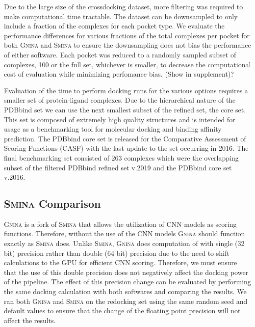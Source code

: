 \documentclass[journal=jcisd8,manuscript=article]{achemso}
\begin{document}
Due to the large size of the crossdocking dataset, more filtering was required to make computational time tractable. The dataset can be downsampled to only include a fraction of the complexes for each pocket type. We evaluate the performance differences for various fractions of the total complexes per pocket for both \textsc{Gnina} and \textsc{Smina} to ensure the downsampling does not bias the performance of either software. Each pocket was reduced to a randomly sampled subset of complexes, 100 or the full set, whichever is smaller, to decrease the computational cost of evaluation while minimizing perfomance bias. (Show in supplement)? 

Evaluation of the time to perform docking runs for the various options requires a smaller set of protein-ligand complexes. Due to the hierarchical nature of the PDBbind set we can use the next smallest subset of the refined set, the core set. This set is composed of extremely high quality structures and is intended for usage as a benchmarking tool for molecular docking and binding affinity prediction. The PDBbind core set is released for the Comparative Assessment of Scoring Functions (CASF) with the last update to the set occurring in 2016. The final benchmarking set consisted of $263$ complexes which were the overlapping subset of the filtered PDBbind refined set v.2019 and the PDBbind core set v.2016.

\subsection{\textsc{Smina} Comparison}
\textsc{Gnina} is a fork of \textsc{Smina} that allows the utilization of CNN models as scoring functions. Therefore, without the use of the CNN models \textsc{Gnina} should function exactly as \textsc{Smina} does. Unlike \textsc{Smina}, \textsc{Gnina} does computation of with single (32 bit) precision rather than double (64 bit) precision due to the need to shift calculations to the GPU for efficient CNN scoring. Therefore, we must ensure that the use of this double precision does not negatively affect the docking power of the pipeline. The effect of this precision change can be evaluated by performing the same docking calculation with both softwares and comparing the results. We ran both \textsc{Gnina} and \textsc{Smina} on the redocking set using the same random seed and default values to ensure that the change of the floating point precision will not affect the results. 
\end{document}
